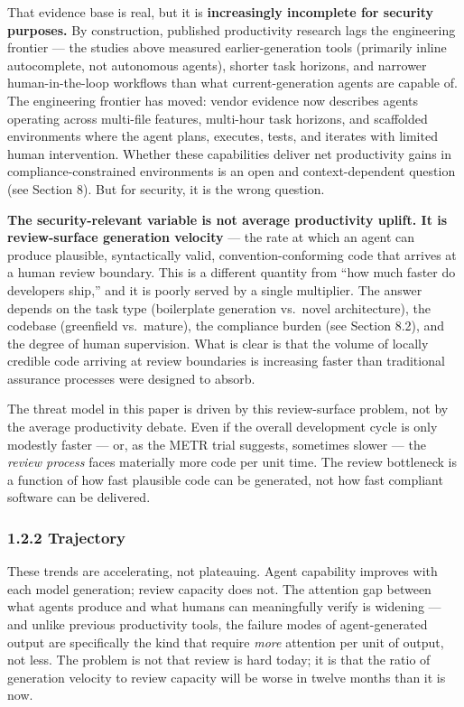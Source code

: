 \documentclass[a4paper,11pt]{report}
\begin{document}
That evidence base is real, but it is \textbf{increasingly incomplete
for security purposes.} By construction, published productivity research
lags the engineering frontier --- the studies above measured
earlier-generation tools (primarily inline autocomplete, not autonomous
agents), shorter task horizons, and narrower human-in-the-loop workflows
than what current-generation agents are capable of. The engineering
frontier has moved: vendor evidence now describes agents operating
across multi-file features, multi-hour task horizons, and scaffolded
environments where the agent plans, executes, tests, and iterates with
limited human intervention. Whether these capabilities deliver net
productivity gains in compliance-constrained environments is an open and
context-dependent question (see Section 8). But for security, it is the
wrong question.

\textbf{The security-relevant variable is not average productivity
uplift. It is review-surface generation velocity} --- the rate at which
an agent can produce plausible, syntactically valid,
convention-conforming code that arrives at a human review boundary. This
is a different quantity from ``how much faster do developers ship,'' and
it is poorly served by a single multiplier. The answer depends on the
task type (boilerplate generation vs.~novel architecture), the codebase
(greenfield vs.~mature), the compliance burden (see Section 8.2), and
the degree of human supervision. What is clear is that the volume of
locally credible code arriving at review boundaries is increasing faster
than traditional assurance processes were designed to absorb.

The threat model in this paper is driven by this review-surface problem,
not by the average productivity debate. Even if the overall development
cycle is only modestly faster --- or, as the METR trial suggests,
sometimes slower --- the \emph{review process} faces materially more
code per unit time. The review bottleneck is a function of how fast
plausible code can be generated, not how fast compliant software can be
delivered.

\hypertarget{trajectory}{%
\subsubsection{1.2.2 Trajectory}\label{trajectory}}

These trends are accelerating, not plateauing. Agent capability improves
with each model generation; review capacity does not. The attention gap
between what agents produce and what humans can meaningfully verify is
widening --- and unlike previous productivity tools, the failure modes
of agent-generated output are specifically the kind that require
\emph{more} attention per unit of output, not less. The problem is not
that review is hard today; it is that the ratio of generation velocity
to review capacity will be worse in twelve months than it is now.
\end{document}
